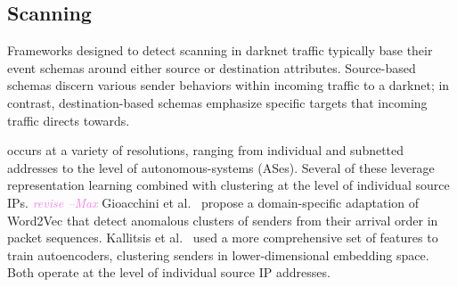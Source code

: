 \documentclass[manuscript,nonacm]{acmart}
\newcommand{\maxnote}[1]{\textit{\textcolor{violet}{#1 --Max}}}
\begin{document}


\subsection{Scanning}

Frameworks designed to detect scanning in darknet traffic typically base their event schemas around either source or destination attributes.
Source-based schemas discern various sender behaviors within incoming traffic to a darknet; in contrast, destination-based schemas emphasize specific targets that incoming traffic directs towards.
\vspace{0.25em}



 occurs at a variety of resolutions, ranging from individual and subnetted addresses to the level of autonomous-systems (ASes).
Several of these leverage representation learning combined with clustering at the level of individual source IPs. \maxnote{revise}
Gioacchini et al.~\cite{@@} propose a domain-specific adaptation of Word2Vec that detect anomalous clusters of senders from their arrival order in packet sequences. 
Kallitsis et al.~\cite{@@} used a more comprehensive set of features to train autoencoders, clustering senders in lower-dimensional embedding space.
Both operate at the level of individual source IP addresses. 
\end{document}
